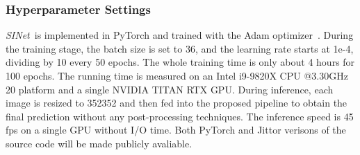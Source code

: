 \documentclass[10pt,journal,compsoc]{IEEEtran}
\def\ournewmodel{\emph{SINet}}
\begin{document}
\subsubsection{Hyperparameter Settings}
\ournewmodel~is implemented in PyTorch and trained with the 
Adam optimizer~\cite{kingma2015adam}.
During the training stage, the batch size is set to 36, 
and the learning rate starts at 1e-4, dividing by 10 every 50 epochs.
The whole training time is only about 4 hours for 100 epochs.
The running time is measured on an Intel
i9-9820X CPU @3.30GHz  20 platform and a single NVIDIA TITAN RTX GPU. 
During inference, each image is resized to 352352 and then fed into 
the proposed pipeline to obtain the final prediction without 
any post-processing techniques.
The inference speed is 45 fps on a single GPU without I/O time.
Both PyTorch \cite{paszke2019pytorch} and Jittor \cite{hu2020jittor} 
verisons of the source code will be made publicly avaliable.
\end{document}
